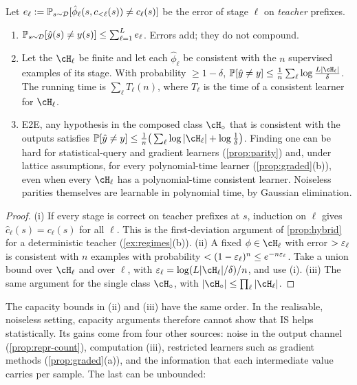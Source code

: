 \begin{theorem}[Composition]\label{thm:composition}
 Let $e_\ell:=\mathbb{P}_{s\sim\mathcal{D}}[\hat\phi_\ell(s,c_{<\ell}(s))\neq c_\ell(s)]$ be the error of stage $\ell$ on
\emph{teacher} prefixes.
\begin{enumerate}[label=(\roman*),nosep]
\item $\mathbb{P}_{s\sim\mathcal{D}}[\hat y(s)\neq y(s)]\le\sum_{\ell=1}^Le_\ell$. Errors add; they do not compound.
\item Let the $\cH_\ell$ be finite and let each $\hat\phi_\ell$ be consistent with the $n$ supervised examples of its stage. With
probability $\ge1-\delta$, $\P[\hat y\neq y]\le\frac1n\sum_\ell\log\frac{L|\cH_\ell|}{\delta}$. The running time is $\sum_\ell T_\ell(n)$,
where $T_\ell$ is the time of a consistent learner for $\cH_\ell$.
\item E2E, any hypothesis in the composed class $\cH_\circ$ that is consistent with the outputs satisfies
$\P[\hat y\neq y]\le\frac1n\big(\sum_\ell\log|\cH_\ell|+\log\frac1\delta\big)$. Finding one can be hard for statistical-query and gradient
learners (\cref{prop:parity}) and, under lattice assumptions, for every polynomial-time learner (\cref{prop:graded}(b)),
even when every $\cH_\ell$ has a polynomial-time consistent learner. Noiseless parities themselves are learnable in
polynomial time, by Gaussian elimination.
\end{enumerate}
\end{theorem}
\begin{proof}
(i) If every stage is correct on teacher prefixes at $s$, induction on $\ell$ gives $\hat c_\ell(s)=c_\ell(s)$ for all $\ell$. This
is the first-deviation argument of \cref{prop:hybrid} for a deterministic teacher (\cref{ex:regimes}(b)).
(ii) A fixed $\phi\in\cH_\ell$ with error $>\varepsilon_\ell$ is consistent with $n$ examples with probability $<(1-\varepsilon_\ell)^n\le e^{-n\varepsilon_\ell}$.
Take a union bound over $\cH_\ell$ and over $\ell$, with $\eps_\ell=\log(L|\cH_\ell|/\delta)/n$, and use (i).
(iii) The same argument for the single class $\cH_\circ$, with $|\cH_\circ|\le\prod_\ell|\cH_\ell|$.
\end{proof}

\noindent
The capacity bounds in (ii) and (iii) have the same order. In the realisable, noiseless setting, capacity arguments
therefore cannot show that IS helps statistically. Its gains come from four other sources: noise in the output
channel (\cref{prop:repr-count}), computation (iii), restricted learners such as gradient methods
(\cref{prop:graded}(a)), and the information that each intermediate value carries per sample. The last can be
unbounded:

